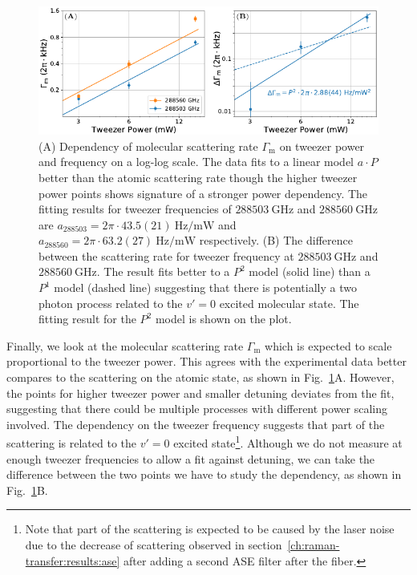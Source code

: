 \begin{figure}
  \centering
  \includegraphics[width=\textwidth]{figures/raman_transfer_scatter_scaling_mol2.pdf}
  \caption[Molecular scattering rate as a function of tweezer power and frequency]{
    (A) Dependency of molecular scattering rate $\Gamma_{\mathrm{m}}$
    on tweezer power and frequency on a log-log scale.
    The data fits to a linear model $a\cdot P$ better than the atomic scattering rate
    though the higher tweezer power points shows signature of a stronger power dependency.
    The fitting results for tweezer frequencies of
    $288503~\mathrm{GHz}$ and $288560~\mathrm{GHz}$ are
    $a_{288503}=2\pi\cdot43.5(21)~\mathrm{Hz/mW}$
    and $a_{288560}=2\pi\cdot63.2(27)~\mathrm{Hz/mW}$ respectively.
    (B) The difference between the scattering rate for tweezer frequency at
    $288503~\mathrm{GHz}$ and $288560~\mathrm{GHz}$.
    The result fits better to a $P^2$ model (solid line) than a $P^1$ model (dashed line)
    suggesting that there is potentially a two photon process
    related to the $v'=0$ excited molecular state.
    The fitting result for the $P^2$ model is shown on the plot.
    \label{fig:raman-transfer:results:scaling:gamma-mol}}
\end{figure}

Finally, we look at the molecular scattering rate $\Gamma_{\mathrm{m}}$
which is expected to scale proportional to the tweezer power.
This agrees with the experimental data better compares to the scattering on the atomic state,
as shown in Fig.~\ref{fig:raman-transfer:results:scaling:gamma-mol}A.
However, the points for higher tweezer power and smaller detuning deviates from the fit,
suggesting that there could be multiple processes with different power scaling involved.
The dependency on the tweezer frequency suggests that
part of the scattering is related to the $v'=0$ excited state\footnote{
  Note that part of the scattering is expected to be caused by the laser noise
  due to the decrease of scattering observed in section~\ref{ch:raman-transfer:results:ase}
  after adding a second ASE filter after the fiber.
}. Although we do not measure at enough tweezer frequencies to allow a fit against detuning,
we can take the difference between the two points we have to study the dependency,
as shown in Fig.~\ref{fig:raman-transfer:results:scaling:gamma-mol}B.

